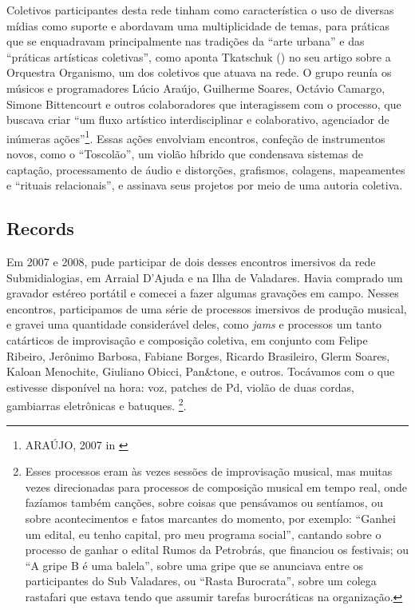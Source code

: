 Coletivos participantes desta rede tinham como característica o uso de diversas mídias como suporte e abordavam uma multiplicidade de temas, para práticas que se enquadravam principalmente nas tradições da ``arte urbana'' e das ``práticas artísticas coletivas'', como aponta Tkatschuk (\citeyear{Tkatschuk2011}) no seu artigo sobre a Orquestra Organismo, um dos coletivos que atuava na rede. O grupo reunía os músicos e programadores Lúcio Araújo, Guilherme Soares, Octávio Camargo, Simone Bittencourt e outros colaboradores que interagissem com o processo, que buscava criar ``um fluxo artístico interdisciplinar e colaborativo, agenciador de inúmeras ações''\footnote{ARAÚJO, 2007 in \cite{Tkatschuk2011}}. Essas ações envolviam encontros, confeção de instrumentos novos, como o ``Toscolão'', um violão híbrido que condensava sistemas de captação, processamento de áudio e distorções, grafismos, colagens, mapeamentes e ``rituais relacionais'', e assinava seus projetos por meio de uma autoria coletiva. 



\subsection{Records}
Em 2007 e 2008, pude participar de dois desses encontros imersivos da rede Submidialogias, em Arraial D'Ajuda e na Ilha de Valadares. Havia comprado um gravador estéreo portátil e comecei a fazer algumas gravações em campo. Nesses encontros, participamos de uma série de processos imersivos de produção musical, e gravei uma quantidade considerável deles, como \emph{jams} e processos um tanto catárticos de improvisação e composição coletiva, em conjunto com Felipe Ribeiro, Jerônimo Barbosa, Fabiane Borges, Ricardo Brasileiro, Glerm Soares, Kaloan Menochite, Giuliano Obicci, Pan\&tone, e outros. Tocávamos com o que estivesse disponível na hora: voz, patches de Pd, violão de duas cordas, gambiarras eletrônicas e batuques. \footnote{Esses processos eram às vezes sessões de improvisação musical, mas muitas vezes direcionadas para processos de composição musical em tempo real, onde fazíamos também canções, sobre coisas que pensávamos ou sentíamos, ou sobre acontecimentos e fatos marcantes do momento, por exemplo: ``Ganhei um edital, eu tenho capital, pro meu programa social'', cantando sobre o processo de ganhar o edital Rumos da Petrobrás, que financiou os festivais; ou ``A gripe B é uma balela'', sobre uma gripe que se anunciava entre os participantes do Sub Valadares, ou ``Rasta Burocrata'', sobre um colega rastafari que estava tendo que assumir tarefas burocráticas na organização.}.


